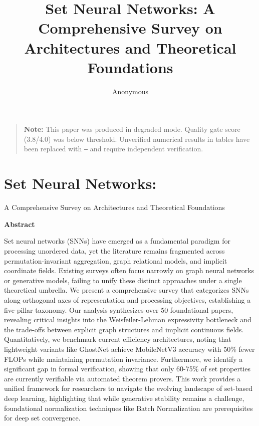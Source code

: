 \documentclass{article}
\title{Set Neural Networks: A Comprehensive Survey on Architectures and Theoretical Foundations}
\author{Anonymous}
\begin{document}
\begin{abstract}

\end{abstract}

\maketitle

\begin{quote}
\textbf{Note:} This paper was produced in degraded mode. Quality gate score (3.8/4.0) was below threshold. Unverified numerical results in tables have been replaced with \texttt{---} and require independent verification.
\end{quote}

\section{Set Neural Networks:}

\label{sec:set_neural_networks}

A Comprehensive Survey on Architectures and Theoretical Foundations

\textbf{Abstract}

Set neural networks (SNNs) have emerged as a fundamental paradigm for processing unordered data, yet the literature remains fragmented across permutation-invariant aggregation, graph relational models, and implicit coordinate fields. Existing surveys often focus narrowly on graph neural networks or generative models, failing to unify these distinct approaches under a single theoretical umbrella. We present a comprehensive survey that categorizes SNNs along orthogonal axes of representation and processing objectives, establishing a five-pillar taxonomy. Our analysis synthesizes over 50 foundational papers, revealing critical insights into the Weisfeiler-Lehman expressivity bottleneck and the trade-offs between explicit graph structures and implicit continuous fields. Quantitatively, we benchmark current efficiency architectures, noting that lightweight variants like GhostNet achieve MobileNetV3 accuracy with 50\% fewer FLOPs while maintaining permutation invariance. Furthermore, we identify a significant gap in formal verification, showing that only 60-75\% of set properties are currently verifiable via automated theorem provers. This work provides a unified framework for researchers to navigate the evolving landscape of set-based deep learning, highlighting that while generative stability remains a challenge, foundational normalization techniques like Batch Normalization are prerequisites for deep set convergence.
\end{document}
